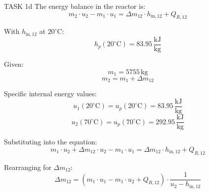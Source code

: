 TASK 1d  
The energy balance in the reactor is:  
\[
m_2 \cdot u_2 - m_1 \cdot u_1 = \Delta m_{12} \cdot h_{\text{in},12} + Q_{R,12}
\]  

With \( h_{\text{in},12} \) at \( 20^\circ\text{C} \):  
\[
h_p(20^\circ\text{C}) = 83.95 \, \frac{\text{kJ}}{\text{kg}}
\]  

Given:  
\[
m_1 = 5755 \, \text{kg}
\]  
\[
m_2 = m_1 + \Delta m_{12}
\]  

Specific internal energy values:  
\[
u_1(20^\circ\text{C}) = u_p(20^\circ\text{C}) = 83.95 \, \frac{\text{kJ}}{\text{kg}}
\]  
\[
u_2(70^\circ\text{C}) = u_p(70^\circ\text{C}) = 292.95 \, \frac{\text{kJ}}{\text{kg}}
\]  

Substituting into the equation:  
\[
m_1 \cdot u_2 + \Delta m_{12} \cdot u_2 - m_1 \cdot u_1 = \Delta m_{12} \cdot h_{\text{in},12} + Q_{R,12}
\]  

Rearranging for \( \Delta m_{12} \):  
\[
\Delta m_{12} = \left( m_1 \cdot u_1 - m_1 \cdot u_2 + Q_{R,12} \right) \cdot \frac{1}{u_2 - h_{\text{in},12}}
\]  